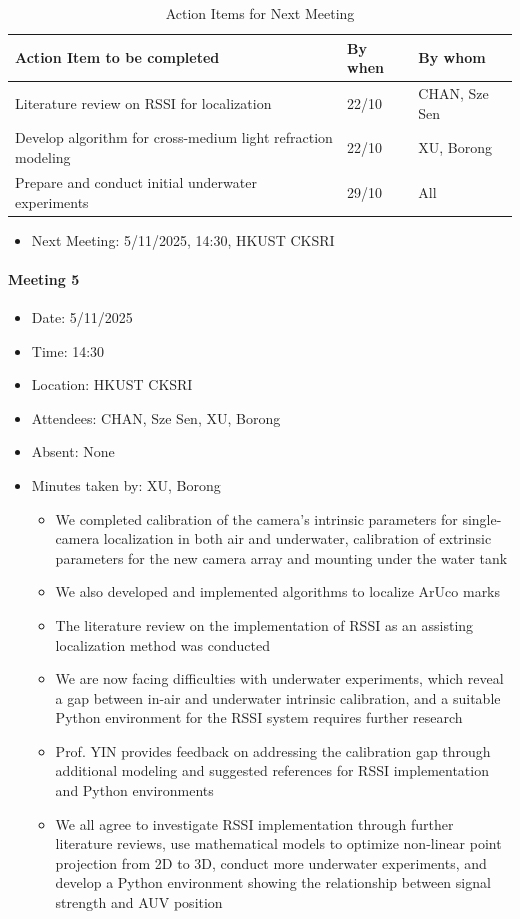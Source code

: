 \documentclass[11pt]{article}
\begin{document}
    \begin{longtable}[c]{|l|l|l|}
        \caption{Action Items for Next Meeting}\\
        \hline
        \textbf{Action Item to be completed} & \textbf{By when} & \textbf{By whom} \\
        \hline
        \endhead
        Literature review on RSSI for localization & 22/10 & CHAN, Sze Sen \\
        \hline
        Develop algorithm for cross-medium light refraction modeling & 22/10 & XU, Borong \\
        \hline
        Prepare and conduct initial underwater experiments & 29/10 & All \\
        \hline
    \end{longtable}
    \begin{itemize}
        \item Next Meeting: 5/11/2025, 14:30, HKUST CKSRI
    \end{itemize}
    \newpage
    \paragraph{Meeting 5}
    \begin{itemize}
        \item Date: 5/11/2025
        \item Time: 14:30
        \item Location: HKUST CKSRI
        \item Attendees: CHAN, Sze Sen, XU, Borong
        \item Absent: None
        \item Minutes taken by: XU, Borong
        \begin{itemize}
            \item We completed calibration of the camera's intrinsic parameters for single-camera localization in both air and underwater, calibration of extrinsic parameters for the new camera array and mounting under the water tank
            \item We also developed and implemented algorithms to localize ArUco marks
            \item The literature review on the implementation of RSSI as an assisting localization method was conducted
            \item We are now facing difficulties with underwater experiments, which reveal a gap between in-air and underwater intrinsic calibration, and a suitable Python environment for the RSSI system requires further research
            \item Prof. YIN provides feedback on addressing the calibration gap through additional modeling and suggested references for RSSI implementation and Python environments
            \item We all agree to investigate RSSI implementation through further literature reviews, use mathematical models to optimize non-linear point projection from 2D to 3D, conduct more underwater experiments, and develop a Python environment showing the relationship between signal strength and AUV position
        \end{itemize}
    \end{itemize}
    
\end{document}
